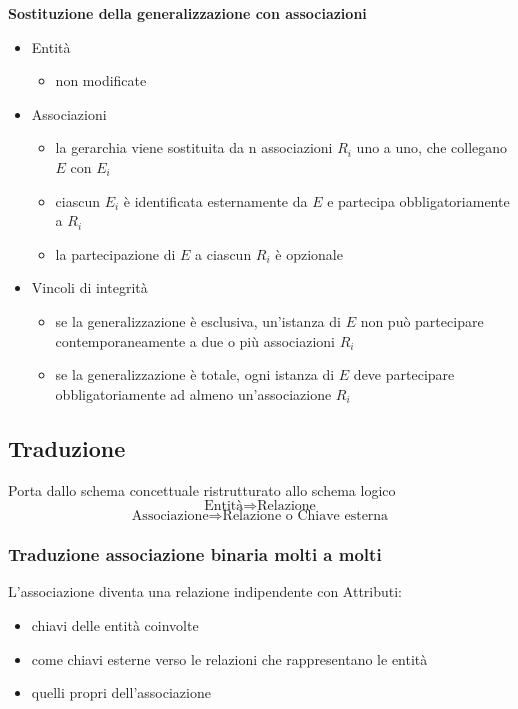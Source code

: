 \newpage \noindent
\textbf{Sostituzione della generalizzazione con associazioni}
\begin{itemize}
    \item Entità
    \begin{itemize}
        \item non modificate
    \end{itemize}
    
    \item Associazioni
    \begin{itemize}
        \item la gerarchia viene sostituita da n associazioni $R_i$ uno a uno, che collegano $E$ con $E_i$
        \item ciascun $E_i$ è identificata esternamente da $E$ e partecipa obbligatoriamente a $R_i$
        \item la partecipazione di $E$ a ciascun $R_i$ è opzionale
    \end{itemize}
    
    \item Vincoli di integrità
    \begin{itemize}
        \item se la generalizzazione è esclusiva, un'istanza di $E$ non può partecipare contemporaneamente a due o più associazioni $R_i$
        \item se la generalizzazione è totale, ogni istanza di $E$ deve partecipare obbligatoriamente ad almeno un’associazione $R_i$
    \end{itemize}
\end{itemize}

\subsection{Traduzione}
Porta dallo schema concettuale ristrutturato allo schema logico
$$\text{Entità} \Rightarrow \text{Relazione}$$
$$\text{Associazione} \Rightarrow \text{Relazione o Chiave esterna}$$

\subsubsection{Traduzione associazione binaria molti a molti}
L’associazione diventa una relazione indipendente con Attributi:
\begin{itemize}
    \item chiavi delle entità coinvolte
    \item come chiavi esterne verso le relazioni che rappresentano le entità
    \item quelli propri dell'associazione
\end{itemize}

